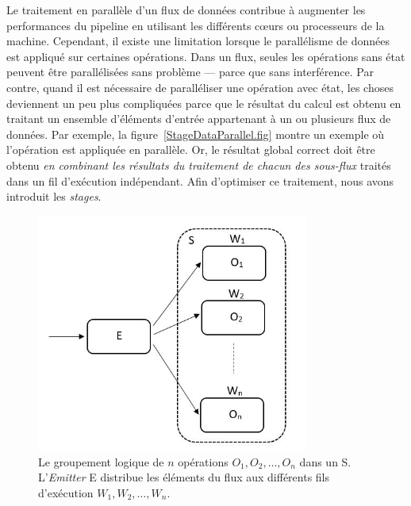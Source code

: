 

Le traitement en parall\`ele d'un flux de donn\'ees contribue \`a augmenter les performances du pipeline en utilisant les diff\'erents cœurs ou processeurs de la machine. Cependant, il existe une limitation lorsque le parall\'elisme de donn\'ees est appliqu\'e sur certaines op\'erations. Dans un flux, seules les op\'erations sans \'etat peuvent \^etre parall\'elis\'ees sans probl\`eme --- parce que sans interf\'erence. Par contre, quand il est n\'ecessaire de parall\'eliser une op\'eration avec \'etat, les choses deviennent un peu plus compliqu\'ees parce que le r\'esultat du calcul est obtenu en traitant un ensemble d'\'el\'ements d'entr\'ee appartenant \`a un ou plusieurs flux de donn\'ees. Par exemple, la figure~\ref{StageDataParallel.fig} montre un exemple o\`u l'op\'eration  est appliqu\'ee en parall\`ele. Or, le r\'esultat global correct doit \^etre obtenu \emph{en combinant les r\'esultats du traitement de chacun des sous-flux} trait\'es dans un fil d'ex\'ecution ind\'ependant. Afin d'optimiser ce traitement, nous avons introduit les \emph{stages}.


\begin{figure}
\centering
     \includegraphics[width=0.8\textwidth]{Figures/Stages.jpg}
      \caption[Le groupement logique de $n$ op\'erations $O_1, O_2, \ldots, O_n$ dans un  S.]{Le groupement logique de $n$ op\'erations $O_1, O_2, \ldots, O_n$ dans un  S.  L'\emph{Emitter} E distribue les \'el\'ements du flux aux diff\'erents fils d'ex\'ecution $W_1, W_2, \ldots, W_n$.}
       \label{Stages.fig}
\end{figure}

